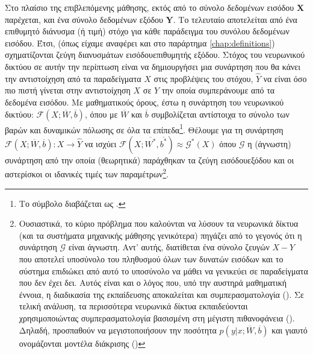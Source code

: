 Στο πλαίσιο της επιβλεπόμενης μάθησης, εκτός από το σύνολο δεδομένων εισόδου $\boldsymbol{X}$ παρέχεται, και ένα σύνολο δεδομένων εξόδου $\boldsymbol{Y}$. Το τελευταίο αποτελείται από ένα επιθυμητό διάνυσμα (ή τιμή) στόχο για κάθε παράδειγμα του συνόλου δεδομένων εισόδου. Έτσι, (όπως είχαμε αναφέρει και στο παράρτημα \ref{chap:definitions}) σχηματίζονται ζεύγη διανυσμάτων εισόδου\textendash επιθυμητής εξόδου. Στόχος του νευρωνικού δικτύου σε αυτήν την περίπτωση είναι να δημιουργήσει μια συνάρτηση που θα κάνει την αντιστοίχηση από τα παραδείγματα $X$ στις προβλέψεις του στόχου, $\hat{Y}$ να είναι όσο πιο πιστή γίνεται στην αντιστοίχηση $X$ σε $Y$ την οποία συμπεράνουμε από τα δεδομένα εισόδου. Με μαθηματικούς όρους, έστω η συνάρτηση του νευρωνικού δικτύου: $\mathcal{F}(X;\overline{W},\overline{b})$, όπου με $\overline{W}$ και $\overline{b}$ συμβολίζεται αντίστοιχα το σύνολο των βαρών και δυναμικών πόλωσης σε όλα τα επίπεδα\footnote{Το σύμβολο \textquote{\en{;}} διαβάζεται ως .}. Θέλουμε για τη συνάρτηση $\mathcal{F}(X;\overline{W},\overline{b}):X \rightarrow \hat{Y}$ να ισχύει $\mathcal{F}(X;\overline{W^*},\overline{b^*}) \approx \mathcal{G^*}(X)$ όπου $\mathcal{G}$ η (άγνωστη) συνάρτηση από την οποία (θεωρητικά) παράχθηκαν τα ζεύγη εισόδου\textendash εξόδου και οι αστερίσκοι οι ιδανικές τιμές των παραμέτρων\footnote{Ουσιαστικά, το κύριο πρόβλημα που καλούνται να λύσουν τα νευρωνικά δίκτυα (και τα συστήματα μηχανικής μάθησης γενικότερα) πηγάζει από το γεγονός ότι η συνάρτηση $\mathcal{G}$ είναι άγνωστη. Αντ' αυτής, διατίθεται ένα σύνολο ζευγών $X-Y$ που αποτελεί υποσύνολο του πληθυσμού όλων των δυνατών εισόδων και το σύστημα επιδιώκει από αυτό το υποσύνολο να μάθει να γενικεύει σε παραδείγματα που δεν έχει δει. Αυτός είναι και ο λόγος που, υπό την αυστηρά μαθηματική έννοια, η διαδικασία της εκπαίδευσης αποκαλείται και συμπερασματολογία (). Σε τελική ανάλυση, τα περισσότερα νευρωνικά δίκτυα εκπαιδεύονται χρησιμοποιώντας συμπερασματολογία βασισμένη στη μέγιστη πιθανοφάνεια ()\cite{goodfellow2016deep}. Δηλαδή, προσπαθούν να μεγιστοποιήσουν την ποσότητα $p(y|x;\overline{W},\overline{b})$ και γιαυτό ονομάζονται μοντέλα διάκρισης ()}.\par

